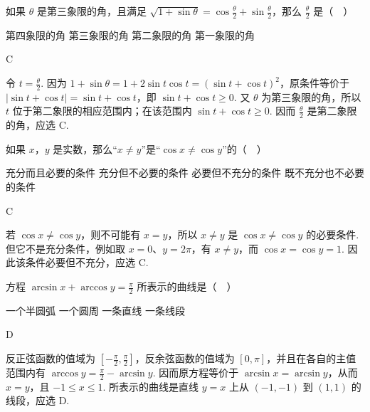 \documentclass[UTF8,a4paper,oneside,11pt]{ctexbook}
\begin{document}
\begin{problem}
如果 \(\theta\) 是第三象限的角，且满足 \(\sqrt{1+\sin \theta}=\cos \frac{\theta}{2}+\sin \frac{\theta}{2}\)，那么 \(\frac{\theta}{2}\) 是（\(\quad\)）

\choices
    {第四象限的角}
    {第三象限的角}
    {第二象限的角}
    {第一象限的角}
\end{problem}

\begin{answer}
C
\end{answer}

\begin{solution}
令 \(t=\frac\theta2\). 因为 \(1+\sin\theta=1+2\sin t\cos t=(\sin t+\cos t)^2\)，原条件等价于
\(\lvert\sin t+\cos t\rvert=\sin t+\cos t\)，即 \(\sin t+\cos t\geqslant0\). 又 \(\theta\) 为第三象限的角，所以 \(t\) 位于第二象限的相应范围内；在该范围内 \(\sin t+\cos t\geqslant0\). 因而 \(\frac\theta2\) 是第二象限的角，应选 C.
\end{solution}

\begin{problem}
如果 \(x\)，\(y\) 是实数，那么“\(x\neq y\)”是“\(\cos x\neq \cos y\)”的（\(\quad\)）

\choices
    {充分而且必要的条件}
    {充分但不必要的条件}
    {必要但不充分的条件}
    {既不充分也不必要的条件}
\end{problem}

\begin{answer}
C
\end{answer}

\begin{solution}
若 \(\cos x\neq\cos y\)，则不可能有 \(x=y\)，所以 \(x\neq y\) 是 \(\cos x\neq\cos y\) 的必要条件. 但它不是充分条件，例如取 \(x=0\)、\(y=2\pi\)，有 \(x\neq y\)，而 \(\cos x=\cos y=1\). 因此该条件必要但不充分，应选 C.
\end{solution}

\begin{problem}
方程 \(\arcsin x+\arccos y=\frac{\pi}{2}\) 所表示的曲线是（\(\quad\)）

\choices
    {一个半圆弧}
    {一个圆周}
    {一条直线}
    {一条线段}
\end{problem}

\begin{answer}
D
\end{answer}

\begin{solution}
反正弦函数的值域为 \(\left[-\frac\pi2,\frac\pi2\right]\)，反余弦函数的值域为 \([0,\pi]\)，并且在各自的主值范围内有 \(\arccos y=\frac\pi2-\arcsin y\). 因而原方程等价于
\(\arcsin x=\arcsin y\)，从而 \(x=y\)，且 \(-1\leqslant x\leqslant1\). 所表示的曲线是直线 \(y=x\) 上从 \((-1,-1)\) 到 \((1,1)\) 的线段，应选 D.
\end{solution}
\end{document}
